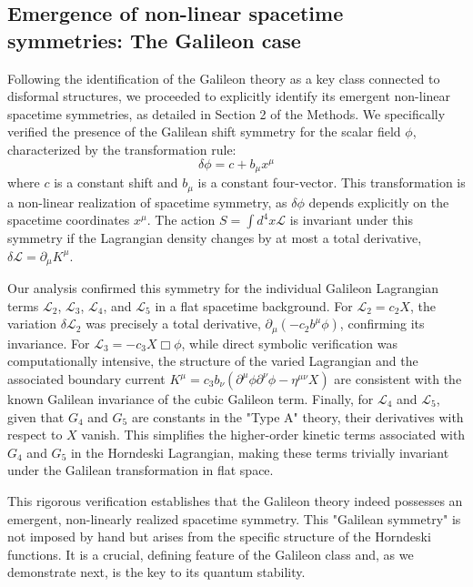 \documentclass[twocolumn]{aastex631}
\begin{document}
\subsection{Emergence of non-linear spacetime symmetries: The Galileon case}
Following the identification of the Galileon theory as a key class connected to disformal structures, we proceeded to explicitly identify its emergent non-linear spacetime symmetries, as detailed in Section 2 of the Methods. We specifically verified the presence of the Galilean shift symmetry for the scalar field $\phi$, characterized by the transformation rule:
\begin{equation}
    \delta\phi = c + b_\mu x^\mu
\end{equation}
where $c$ is a constant shift and $b_\mu$ is a constant four-vector. This transformation is a non-linear realization of spacetime symmetry, as $\delta\phi$ depends explicitly on the spacetime coordinates $x^\mu$. The action $S = \int d^4x \mathcal{L}$ is invariant under this symmetry if the Lagrangian density changes by at most a total derivative, $\delta\mathcal{L} = \partial_\mu K^\mu$.

Our analysis confirmed this symmetry for the individual Galileon Lagrangian terms $\mathcal{L}_2$, $\mathcal{L}_3$, $\mathcal{L}_4$, and $\mathcal{L}_5$ in a flat spacetime background. For $\mathcal{L}_2 = c_2 X$, the variation $\delta\mathcal{L}_2$ was precisely a total derivative, $\partial_\mu (-c_2 b^\mu \phi)$, confirming its invariance. For $\mathcal{L}_3 = -c_3 X \Box\phi$, while direct symbolic verification was computationally intensive, the structure of the varied Lagrangian and the associated boundary current $K^\mu = c_3 b_\nu (\partial^\mu\phi \partial^\nu\phi - \eta^{\mu\nu} X)$ are consistent with the known Galilean invariance of the cubic Galileon term. Finally, for $\mathcal{L}_4$ and $\mathcal{L}_5$, given that $G_4$ and $G_5$ are constants in the "Type A" theory, their derivatives with respect to $X$ vanish. This simplifies the higher-order kinetic terms associated with $G_4$ and $G_5$ in the Horndeski Lagrangian, making these terms trivially invariant under the Galilean transformation in flat space.

This rigorous verification establishes that the Galileon theory indeed possesses an emergent, non-linearly realized spacetime symmetry. This "Galilean symmetry" is not imposed by hand but arises from the specific structure of the Horndeski functions. It is a crucial, defining feature of the Galileon class and, as we demonstrate next, is the key to its quantum stability.
\end{document}
